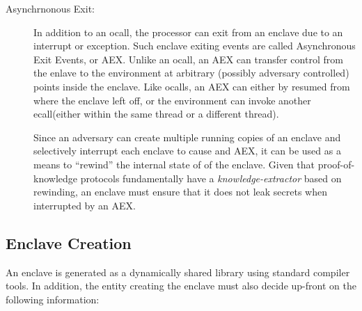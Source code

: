 \documentclass[10pt]{article}
\newcommand{\ecall}{\textsf{ecall}}
\newcommand{\ocall}{\textsf{ocall}}
\begin{document}
\begin{description}
  \item[Asynchrnonous Exit:] In addition to an \ocall, the processor
    can exit from an enclave due to an interrupt or exception. Such
    enclave exiting events are called Asynchronous Exit Events, or
    AEX. Unlike an \ocall, an AEX can transfer control from the enlave
    to the environment at arbitrary (possibly adversary controlled)
    points inside the enclave. Like \ocall s, an AEX can either by
    resumed from where the enclave left off, or the environment can
    invoke another \ecall (either within the same thread or a
    different thread).

    Since an adversary can create multiple running copies of an
    enclave and selectively interrupt each enclave to cause and AEX,
    it can be used as a means to ``rewind'' the internal state of of
    the enclave. Given that proof-of-knowledge \cite{BellarePOK}
    protocols fundamentally have a \textit{knowledge-extractor} based
    on rewinding, an enclave must ensure that it does not leak secrets
    when interrupted by an AEX.

  \end{description}

  \subsection{Enclave Creation}
  \label{sec:enclavecreateion}
  An enclave is generated as a dynamically shared library using
  standard compiler tools. In addition, the entity creating the
  enclave must also decide up-front on the following information:
\end{document}
